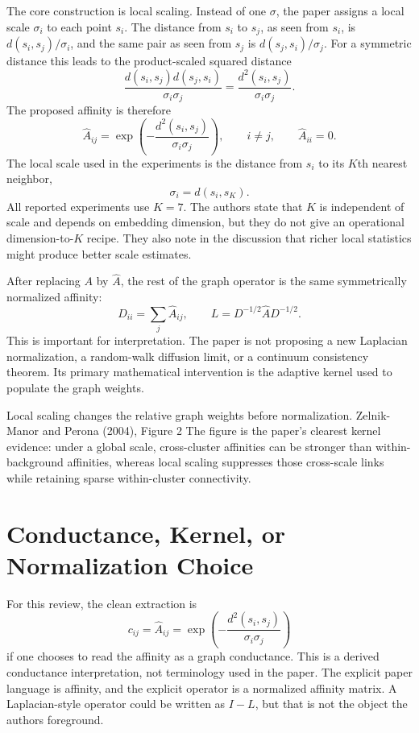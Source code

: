 \documentclass[11pt]{article}
\begin{document}
The core construction is local scaling. Instead of one \(\sigma\), the paper
assigns a local scale \(\sigma_i\) to each point \(s_i\). The distance from
\(s_i\) to \(s_j\), as seen from \(s_i\), is \(d(s_i,s_j)/\sigma_i\), and the
same pair as seen from \(s_j\) is \(d(s_j,s_i)/\sigma_j\). For a symmetric
distance this leads to the product-scaled squared distance
\[
  \frac{d(s_i,s_j)d(s_j,s_i)}{\sigma_i\sigma_j}
  =
  \frac{d^2(s_i,s_j)}{\sigma_i\sigma_j}.
\]
The proposed affinity is therefore
\[
  \hat A_{ij}
  =
  \exp\left(-\frac{d^2(s_i,s_j)}{\sigma_i\sigma_j}\right),
  \qquad i\ne j,
  \qquad \hat A_{ii}=0.
\]
The local scale used in the experiments is the distance from \(s_i\) to its
\(K\)th nearest neighbor,
\[
  \sigma_i = d(s_i,s_K).
\]
All reported experiments use \(K=7\). The authors state that \(K\) is
independent of scale and depends on embedding dimension, but they do not give
an operational dimension-to-\(K\) recipe. They also note in the discussion
that richer local statistics might produce better scale estimates.

After replacing \(A\) by \(\hat A\), the rest of the graph operator is the same
symmetrically normalized affinity:
\[
  D_{ii}=\sum_j \hat A_{ij}, \qquad
  L = D^{-1/2}\hat A D^{-1/2}.
\]
This is important for interpretation. The paper is not proposing a new
Laplacian normalization, a random-walk diffusion limit, or a continuum
consistency theorem. Its primary mathematical intervention is the adaptive
kernel used to populate the graph weights.

{Local scaling changes the relative graph weights before normalization.}
{Zelnik-Manor and Perona (2004), Figure 2}
{The figure is the paper's clearest kernel evidence: under a global scale,
cross-cluster affinities can be stronger than within-background affinities,
whereas local scaling suppresses those cross-scale links while retaining sparse
within-cluster connectivity.}

\section{Conductance, Kernel, or Normalization Choice}

For this review, the clean extraction is
\[
  c_{ij} = \hat A_{ij}
  =
  \exp\left(-\frac{d^2(s_i,s_j)}{\sigma_i\sigma_j}\right)
\]
if one chooses to read the affinity as a graph conductance. This is a derived
conductance interpretation, not terminology used in the paper. The explicit
paper language is affinity, and the explicit operator is a normalized affinity
matrix. A Laplacian-style operator could be written as \(I-L\), but that is not
the object the authors foreground.
\end{document}
